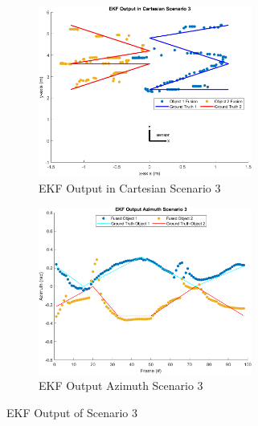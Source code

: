 \begin{figure}[!htb]
    \hspace{0.1\textwidth}
    \begin{subfigure}[b]{0.3\textwidth}%
        \includegraphics[width=7cm]{Figures/matlab/EKF Output in Cartesian Scenario 3.png}
        \caption{EKF Output in Cartesian Scenario 3}
        \label{subfig:ekf_cart_3}
    \end{subfigure}
    \hspace{0.15\textwidth}
    \begin{subfigure}[b]{0.3\textwidth}%
        \includegraphics[width=7cm]{Figures/matlab/EKF Output Azimuth Scenario 3.png}
        \caption{EKF Output Azimuth Scenario 3}
        \label{subfig:ekf_azi_3}
    \end{subfigure}

    \caption{EKF Output of Scenario 3}
    \label{fig:ekf_3}
\end{figure}

